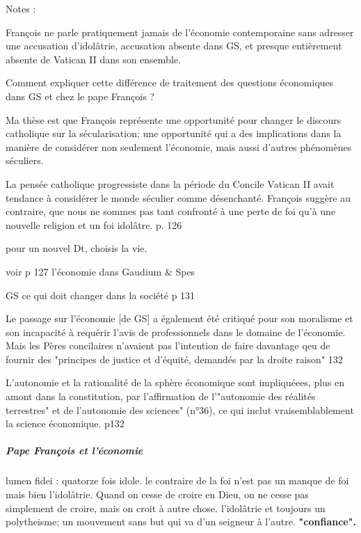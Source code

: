    Notes :
\begin{singlequote}
François ne parle pratiquement jamais de l’économie contemporaine sans adresser une accusation d’idolâtrie, accusation absente dans GS, et presque entièrement absente de Vatican II dans son ensemble.

Comment expliquer cette différence de traitement des questions économiques dans GS et chez le pape François ?

Ma thèse est que François représente une opportunité pour changer le discours catholique sur la sécularisation; une opportunité qui a des implications dans la manière de considérer non seulement l’économie, mais aussi d’autres phénomènes séculiers.

La pensée catholique progressiste dans la période du Concile Vatican II avait tendance à considérer le monde séculier comme désenchanté. François suggère au contraire, que nous ne sommes pas tant confronté à une perte de foi qu’à une nouvelle religion et un foi idolâtre. p. 126
\end{singlequote}

        pour un nouvel Dt, choisis la vie.

        voir p 127 l’économie dans Gaudium \& Spes

GS ce qui doit changer dans la société p 131        
\begin{singlequote}
Le passage sur l'économie [de GS] a également été critiqué pour son moralisme et son incapacité à requérir l'avis de professionnels dans le domaine de l'économie. Mais les Pères concilaires n'avaient pas l'intention de faire davantage qeu de fournir des "principes de justice et d'équité, demandés par la droite raison" 132


L'autonomie et la rationalité de la sphère économique sont impliquéees, plus en amont dans la constitution, par l'affirmation de l'"autonomie des réalités terrestres" et de l'autonomie des sciences" (n°36), ce qui inclut vraisemblablement la science économique. p132

\end{singlequote}        

\subparagraph{Pape François et l'économie}
lumen fidei : quatorze fois idole. le contraire de la foi n'est pas un manque de foi mais bien l'idolâtrie. Quand on cesse de croire en Dieu, on ne cesse pas simplement de croire, mais on croit à autre chose.  l'idolâtrie et toujours un polytheisme; un mouvement sans but qui va d'un seigneur à l'autre. \textbf{"confiance".}
 

